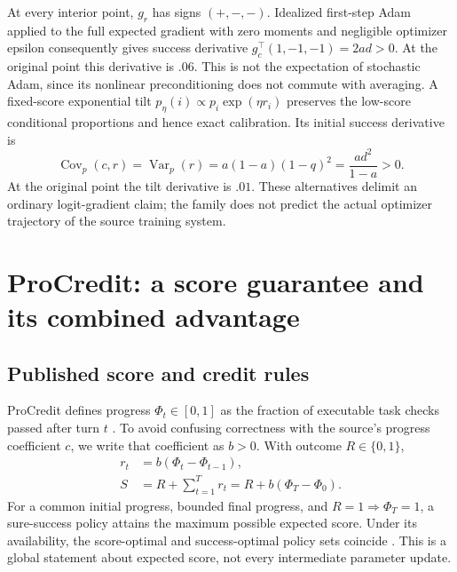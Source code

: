 \documentclass[11pt]{article}
\begin{document}
At every interior point, $g_r$ has signs $(+,-,-)$. Idealized first-step
Adam applied to the full expected gradient with zero moments and negligible
optimizer epsilon consequently gives success derivative
$g_c^\top(1,-1,-1)=2ad>0$.
At the original point this derivative is $.06$. This is not the expectation of stochastic Adam, since its nonlinear
preconditioning does not commute with averaging.
A fixed-score exponential tilt
$p_\eta(i)\propto p_i\exp(\eta r_i)$ preserves the low-score conditional
proportions and hence exact calibration. Its initial success derivative is
\begin{equation}
 \operatorname{Cov}_p(c,r)=\operatorname{Var}_p(r)
 =a(1-a)(1-q)^2=\frac{ad^2}{1-a}>0.
 \label{eq:family_tilt}
\end{equation}
At the original point the tilt derivative is $.01$. These alternatives delimit an ordinary logit-gradient
claim; the family does not predict the actual optimizer trajectory of the
source training system.

\section{ProCredit: a score guarantee and its combined advantage}
\label{sec:procredit}

\subsection{Published score and credit rules}
ProCredit defines progress $\Phi_t\in[0,1]$ as the fraction of executable task checks passed after turn $t$ \citep[Section 3, PDF pp.~5--6]{ma2026procredit}. To avoid confusing correctness with the source's progress coefficient $c$, we write that coefficient as $b>0$. With outcome $R\in\{0,1\}$,
\begin{align}
r_t&=b(\Phi_t-\Phi_{t-1}),\nonumber\\
S&=R+\sum_{t=1}^T r_t=R+b(\Phi_T-\Phi_0).
\label{eq:proscore}
\end{align}
For a common initial progress, bounded final progress, and $R=1\Rightarrow\Phi_T=1$, a sure-success policy attains the maximum possible expected score. Under its availability, the score-optimal and success-optimal policy sets coincide \citep[Appendix G, Proposition 3, PDF p.~23]{ma2026procredit}. This is a global statement about expected score, not every intermediate parameter update.
\end{document}
